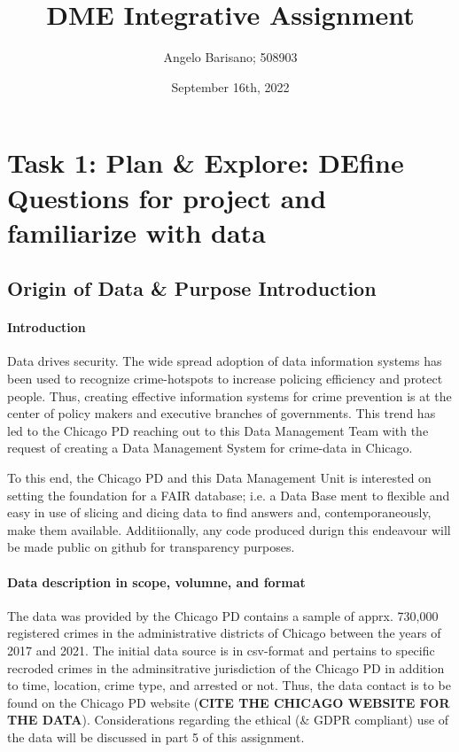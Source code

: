 \documentclass[a4paper]{article}
\begin{document}
\title{DME Integrative Assignment}
\author{Angelo Barisano; 508903 }
\date{September 16th, 2022}
\maketitle

\newpage
\section{Task 1: Plan \& Explore: DEfine Questions for project and familiarize with data}

\subsection{Origin of Data \& Purpose Introduction}
\paragraph{Introduction} Data drives security. The wide spread adoption of data information systems has been used to recognize crime-hotspots to increase policing efficiency and protect people. Thus, creating effective information systems for crime prevention is at the center of policy makers and executive branches of governments. This trend has led to the Chicago PD reaching out to this Data Management Team with the request of creating a Data Management System for crime-data in Chicago.

To this end, the Chicago PD and this Data Management Unit is interested on setting the foundation for a FAIR database; i.e. a Data Base ment to flexible and easy in use of slicing and dicing data to find answers and, contemporaneously, make them available. Additiionally, any code produced durign this endeavour will be made public on github for transparency purposes. 

\paragraph{Data description in scope, volumne, and format}
The data was provided by the Chicago PD contains a sample of apprx. 730,000 registered crimes in the administrative districts of Chicago between the years of 2017 and 2021. The initial data source is in csv-format and pertains to specific recroded crimes in the adminsitrative jurisdiction of the Chicago PD in addition to time, location, crime type, and arrested or not. Thus, the data contact is to be found on the Chicago PD website (\textbf{CITE THE CHICAGO WEBSITE FOR THE DATA}). Considerations regarding the ethical (\& GDPR compliant) use of the data will be discussed in part 5 of this assignment.
\end{document}
